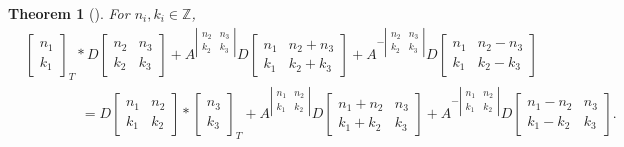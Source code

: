 \documentclass{article}
\newcommand{\Z}{\mathbb{Z}}
\newcommand{\two}[2]{\begin{bmatrix}#1\\#2\end{bmatrix}}
\newtheorem{theorem}{Theorem}[section]
\theoremstyle{definition}
\begin{document}
\begin{theorem}[]
    For $n_i,k_i\in \Z$,
    \begin{align*}
    &\two{n_1}{k_1}_T*D\begin{bmatrix}
        n_2&n_3\\
        k_2&k_3
    \end{bmatrix}+A^{\left|\begin{smallmatrix}
        n_2&n_3\\
        k_2&k_3
    \end{smallmatrix}\right|}D\begin{bmatrix}
        n_1&n_2+n_3\\
        k_1&k_2+k_3
    \end{bmatrix}+A^{-\left|\begin{smallmatrix}
        n_2&n_3\\
        k_2&k_3
    \end{smallmatrix}\right|}D\begin{bmatrix}
        n_1&n_2-n_3\\
        k_1&k_2-k_3
    \end{bmatrix}\\
    &\qquad\qquad=D\begin{bmatrix}
        n_1&n_2\\
        k_1&k_2
    \end{bmatrix}*\two{n_3}{k_3}_T+A^{\left|\begin{smallmatrix}
        n_1&n_2\\
        k_1&k_2
    \end{smallmatrix}\right|}D\begin{bmatrix}
        n_1+n_2&n_3\\
        k_1+k_2&k_3
    \end{bmatrix}+A^{-\left|\begin{smallmatrix}
        n_1&n_2\\
        k_1&k_2
    \end{smallmatrix}\right|}D\begin{bmatrix}
        n_1-n_2&n_3\\
        k_1-k_2&k_3
    \end{bmatrix}.
    \end{align*}
\end{theorem}
\end{document}
